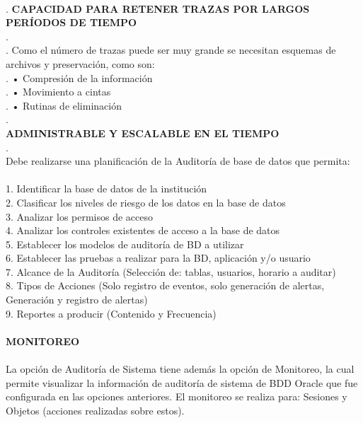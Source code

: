 \documentclass[twoside,twocolumn]{article}
\begin{document}
\begin{flushright}
\begin{itemize}
 \textbf{}\\ .
 \textbf{CAPACIDAD PARA RETENER TRAZAS POR LARGOS PERÍODOS DE TIEMPO}\\ .
 \textbf{}\\ .
 Como el número de trazas puede ser muy grande se necesitan esquemas de archivos y preservación, como son:  \textbf{}\\ .
•	Compresión de la información \textbf{}\\ .
•	Movimiento a cintas  \textbf{}\\ .
•	Rutinas de eliminación \textbf{}\\ .
 \textbf{}\\ 
 \textbf{ADMINISTRABLE Y ESCALABLE EN EL TIEMPO }\\ .
 \textbf{}\\ 
Debe realizarse una planificación de la Auditoría de base de datos que permita:  \textbf{}\\ 
 \textbf{}\\ 
1. Identificar la base de datos de la institución  \textbf{}\\ 
2. Clasificar los niveles de riesgo de los datos en la base de datos  \textbf{}\\ 
3. Analizar los permisos de acceso  \textbf{}\\ 
4. Analizar los controles existentes de acceso a la base de datos  \textbf{}\\ 
5. Establecer los modelos de auditoría de BD a utilizar  \textbf{}\\ 
6. Establecer las pruebas a realizar para la BD, aplicación y/o usuario  \textbf{}\\ 
7. Alcance de la Auditoría (Selección de: tablas, usuarios, horario a auditar)  \textbf{}\\ 
8. Tipos de Acciones (Solo registro de eventos, solo generación de alertas, Generación y registro de alertas)  \textbf{}\\ 
9. Reportes a producir (Contenido y Frecuencia) \textbf{}\\ 
 \textbf{}\\ 
 \textbf{MONITOREO }\\ 
 \textbf{}\\ 
La opción de Auditoría de Sistema tiene además la opción de Monitoreo, la cual permite visualizar la información de auditoría de sistema de BDD Oracle que fue configurada en las opciones anteriores. El monitoreo se realiza para: Sesiones y Objetos (acciones realizadas sobre estos). 
 \textbf{}\\ 


\end{itemize}
\end{flushright}
\end{document}
